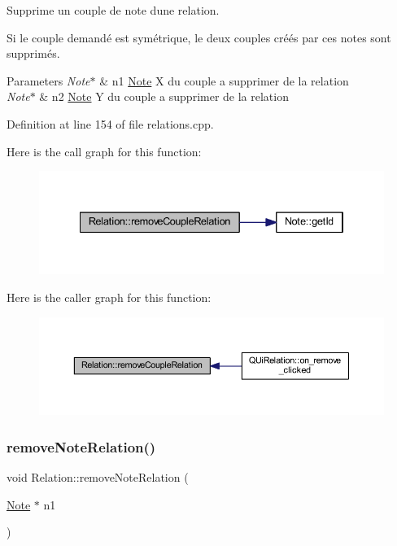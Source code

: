 Supprime un couple de note d\textquotesingle{}une relation. 

Si le couple demandé est symétrique, le deux couples créés par ces notes sont supprimés. 
\begin{DoxyParams}{Parameters}
{\em Note$\ast$} & n1 \hyperlink{class_note}{Note} X du couple a supprimer de la relation \\
\hline
{\em Note$\ast$} & n2 \hyperlink{class_note}{Note} Y du couple a supprimer de la relation \\
\hline
\end{DoxyParams}


Definition at line 154 of file relations.\+cpp.

Here is the call graph for this function\+:\nopagebreak
\begin{figure}[H]
\begin{center}
\leavevmode
\includegraphics[width=334pt]{class_relation_ab81e16d688dcb4703e8ab299fef80c10_cgraph}
\end{center}
\end{figure}
Here is the caller graph for this function\+:\nopagebreak
\begin{figure}[H]
\begin{center}
\leavevmode
\includegraphics[width=350pt]{class_relation_ab81e16d688dcb4703e8ab299fef80c10_icgraph}
\end{center}
\end{figure}
\mbox{\label{class_relation_a8f25fe0ab5bf722eb08d2dd31e99c7f4}} 
\subsubsection{\texorpdfstring{remove\+Note\+Relation()}{removeNoteRelation()}}
{\footnotesize\ttfamily void Relation\+::remove\+Note\+Relation (\begin{DoxyParamCaption}\item[{\hyperlink{class_note}{Note} $\ast$}]{n1 }\end{DoxyParamCaption})}



